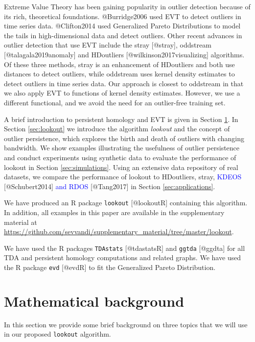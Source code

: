 \documentclass[
]{article}
\begin{document}
Extreme Value Theory has been gaining popularity in outlier detection
because of its rich, theoretical foundations. @Burridge2006 used EVT to
detect outliers in time series data. @Clifton2014 used Generalized
Pareto Distributions to model the tails in high-dimensional data and
detect outliers. Other recent advances in outlier detection that use EVT
include the stray {[}@stray{]}, oddstream {[}@talagala2019anomaly{]} and
HDoutliers {[}@wilkinson2017visualizing{]} algorithms. Of these three
methods, stray is an enhancement of HDoutliers and both use distances to
detect outliers, while oddstream uses kernel density estimates to detect
outliers in time series data. Our approach is closest to oddstream in
that we also apply EVT to functions of kernel density estimates.
However, we use a different functional, and we avoid the need for an
outlier-free training set.

A brief introduction to persistent homology and EVT is given in Section
\ref{sec:methodology}. In Section \ref{sec:lookout} we introduce the
algorithm \emph{lookout} and the concept of outlier persistence, which
explores the birth and death of outliers with changing bandwidth. We
show examples illustrating the usefulness of outlier persistence and
conduct experiments using synthetic data to evaluate the performance of
lookout in Section \ref{sec:simulations}. Using an extensive data
repository of real datasets, we compare the performance of lookout to
HDoutliers, stray, \textcolor{blue}{KDEOS} {[}@Schubert2014{]}
\textcolor{blue}{and RDOS} {[}@Tang2017{]} in Section
\ref{sec:applications}.

We have produced an R package \texttt{lookout} {[}@lookoutR{]}
containing this algorithm. In addition, all examples in this paper are
available in the supplementary material at
\url{https://github.com/sevvandi/supplementary_material/tree/master/lookout}.

We have used the R packages \texttt{TDAstats} {[}@tdastatsR{]} and
\texttt{ggtda} {[}@ggdta{]} for all TDA and persistent homology
computations and related graphs. We have used the R package \texttt{evd}
{[}@evdR{]} to fit the Generalized Pareto Distribution.

\hypertarget{sec:methodology}{%
\section{Mathematical background}\label{sec:methodology}}

In this section we provide some brief background on three topics that we
will use in our proposed \texttt{lookout} algorithm.
\end{document}
